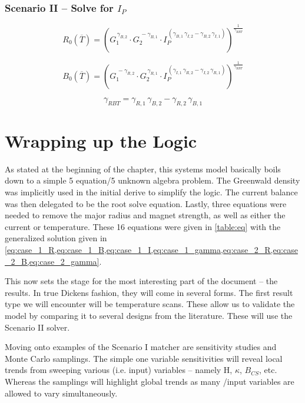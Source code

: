 \subsubsection{Scenario II -- Solve for $I_P$}

\begin{equation}
	\label{eq:case_2_R}
	R_0( \overline T) = \left( 
	G_1 ^ {  \, \gamma_{B,2} } \cdot 
	G_2 ^ {  \, -\gamma_{B,1} } \cdot 
	I_P ^ {  \, ( \gamma_{B,1} \, \gamma_{I,2} - \gamma_{B,2} \, \gamma_{I,1} ) }\right)^{ \frac{1}{\gamma_{RBT}} }
\end{equation}

\begin{equation}
	\label{eq:case_2_B}
	B_0( \overline T) = \left( 
	G_1 ^ {  \, -\gamma_{R,2} } \cdot 
	G_2 ^ {  \, \gamma_{R,1} } \cdot 
	I_P ^ {  \, ( \gamma_{I,1} \, \gamma_{R,2} - \gamma_{I,2} \, \gamma_{R,1} ) }\right)^{ \frac{1}{\gamma_{RBT}} }
\end{equation}

\begin{equation}
	\label{eq:case_2_gamma}
	\gamma_{RBT} = \gamma_{R,1} \, \gamma_{B,2} - \gamma_{R,2} \, \gamma_{B,1}
\end{equation}

\section{Wrapping up the Logic} 

As stated at the beginning of the chapter, this systems model basically boils down to a simple 5 equation/5 unknown algebra problem. The Greenwald density was implicitly used in the initial derive to simplify the logic. The current balance was then delegated to be the root solve equation. Lastly, three equations were needed to remove the major radius and magnet strength, as well as either the current or temperature. These 16 equations were given in \cref{table:eq} with the generalized solution given in \cref{eq:case_1_R,eq:case_1_B,eq:case_1_I,eq:case_1_gamma,eq:case_2_R,eq:case_2_B,eq:case_2_gamma}.

This now sets the stage for the most interesting part of the document -- the results. In true Dickens fashion, they will come in several forms. The first result type we will encounter will be temperature scans. These allow us to validate the model by comparing it to several designs from the literature. These will use the Scenario II solver.

Moving onto examples of the Scenario I matcher are sensitivity studies and Monte Carlo samplings. The simple one variable sensitivities will reveal local trends from sweeping various  (i.e. input) variables -- namely H, $\kappa$, $B_{CS}$, etc. Whereas the samplings will highlight global trends as many /input variables are allowed to vary simultaneously.

